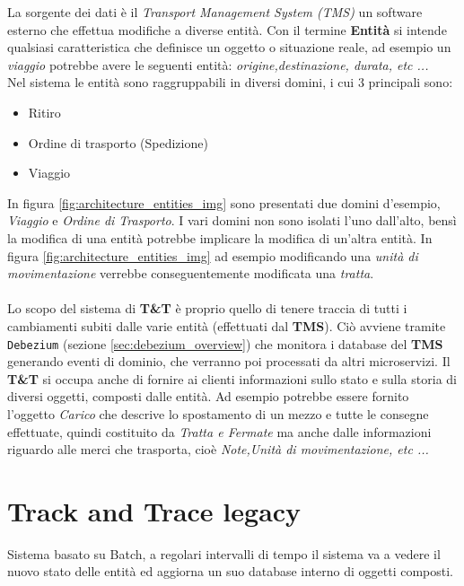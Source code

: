 La sorgente dei dati è il \textit{Transport Management System (TMS)} un software esterno che effettua modifiche a diverse entità.
Con il termine \textbf{Entità} si intende qualsiasi caratteristica che definisce un oggetto o situazione reale, ad esempio un \textit{viaggio} potrebbe avere le seguenti entità:
\textit{origine,destinazione, durata, etc ...}\\
Nel sistema le entità sono raggruppabili in diversi domini, i cui 3 principali sono:
\begin{itemize}
    \item Ritiro
    \item Ordine di trasporto (Spedizione)
    \item Viaggio
\end{itemize}
In figura \ref{fig:architecture_entities_img} sono presentati due domini d'esempio, \textit{Viaggio} e \textit{Ordine di Trasporto}.
I vari domini non sono isolati l'uno dall'alto, bensì la modifica di una entità potrebbe implicare la modifica di un'altra entità.
In figura \ref{fig:architecture_entities_img} ad esempio modificando una \textit{unità di movimentazione} verrebbe conseguentemente modificata una \textit{tratta}.
\\
\\
Lo scopo del sistema di \textbf{T\&T} è proprio quello di tenere traccia di tutti i cambiamenti subiti dalle varie entità (effettuati dal \textbf{TMS}).
Ciò avviene tramite \texttt{Debezium} (sezione \ref{sec:debezium_overview}) che monitora i database del \textbf{TMS} generando eventi di dominio, che verranno poi processati da altri microservizi.
Il \textbf{T\&T} si occupa anche di fornire ai clienti informazioni sullo stato e sulla storia di diversi oggetti, composti dalle entità.
Ad esempio potrebbe essere fornito l'oggetto \textit{Carico} che descrive lo spostamento di un mezzo e tutte le consegne effettuate,
quindi costituito da \textit{Tratta e Fermate} ma anche dalle informazioni riguardo alle merci che trasporta, cioè \textit{Note,Unità di movimentazione, etc ...}

\section{Track and Trace legacy}
\label{sec:T&T_old}
Sistema basato su Batch, a regolari intervalli di tempo il sistema va a vedere il nuovo stato delle entità ed aggiorna un suo database interno di oggetti composti.

